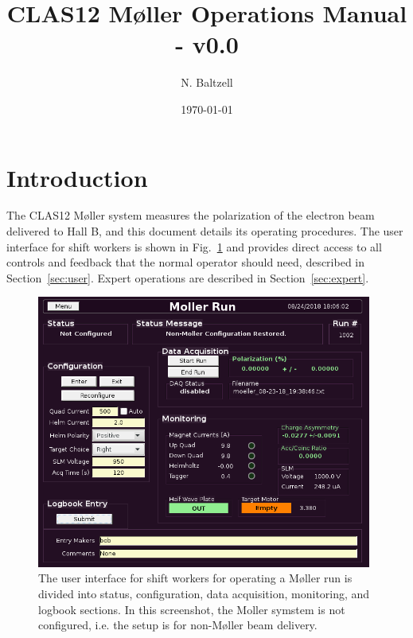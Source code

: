 \documentclass[amsmath,amssymb,notitlepage,11pt]{revtex4}
\begin{document}
\title{CLAS12 M{\o}ller Operations Manual - v0.0}
\date{\today}
\author{N. Baltzell}
\begin{abstract}
\end{abstract}

\maketitle

\section{Introduction}
The CLAS12 M{\o}ller system measures the polarization of the electron beam delivered to Hall B, and this document details its operating procedures.  The user interface for shift workers is shown in Fig.~\ref{fig:unconfig} and provides direct access to all controls and feedback that the normal operator should need, described in Section~\ref{sec:user}.  Expert operations are described in Section~\ref{sec:expert}.

\begin{figure}[htbp]\centering
    \includegraphics[width=11cm]{pics/unconfig}
    \caption{The user interface for shift workers for operating a M{\o}ller run is divided into status, configuration, data acquisition, monitoring, and logbook sections.  In this screenshot, the Moller symstem is not configured, i.e. the setup is for non-M{\o}ller beam delivery.\label{fig:unconfig}}
\end{figure}
\end{document}
